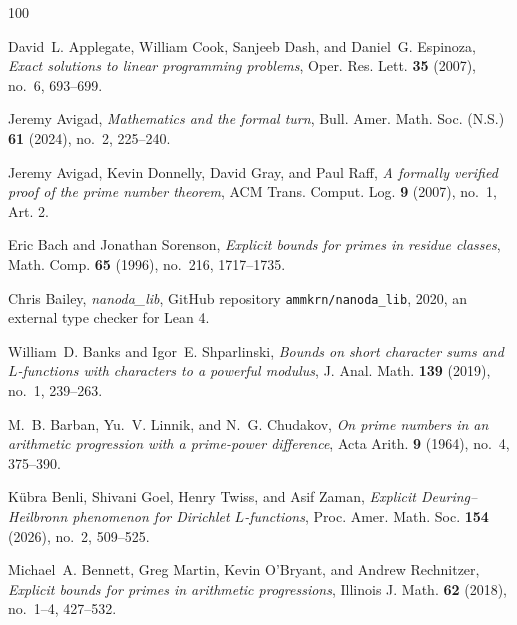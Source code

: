 \documentclass[11pt]{amsart}
\numberwithin{equation}{section}
\theoremstyle{plain}
\theoremstyle{definition}
\theoremstyle{remark}
\newcommand{\1}{\mathbf{1}}
\begin{document}

\providecommand{\bysame}{\leavevmode\hbox to3em{\hrulefill}\thinspace}
\providecommand{\MR}{\relax\ifhmode\unskip\space\fi MR }
\providecommand{\MRhref}[2]{%
  \href{http://www.ams.org/mathscinet-getitem?mr=#1}{#2}
}
\providecommand{\href}[2]{#2}
\begin{thebibliography}{100}

David~L. Applegate, William Cook, Sanjeeb Dash, and Daniel~G. Espinoza,
  \emph{Exact solutions to linear programming problems}, Oper. Res. Lett.
  \textbf{35} (2007), no.~6, 693--699.

Jeremy Avigad, \emph{Mathematics and the formal turn}, Bull. Amer. Math. Soc.
  (N.S.) \textbf{61} (2024), no.~2, 225--240.

Jeremy Avigad, Kevin Donnelly, David Gray, and Paul Raff, \emph{A formally
  verified proof of the prime number theorem}, ACM Trans. Comput. Log.
  \textbf{9} (2007), no.~1, Art. 2.

Eric Bach and Jonathan Sorenson, \emph{Explicit bounds for primes in residue
  classes}, Math. Comp. \textbf{65} (1996), no.~216, 1717--1735.

Chris Bailey, \emph{nanoda\_lib}, GitHub repository
  \texttt{ammkrn/nanoda\_lib}, 2020, an external type checker for Lean 4.

William~D. Banks and Igor~E. Shparlinski, \emph{Bounds on short character sums
  and {$L$}-functions with characters to a powerful modulus}, J. Anal. Math.
  \textbf{139} (2019), no.~1, 239--263.

M.~B. Barban, Yu.~V. Linnik, and N.~G. Chudakov, \emph{On prime numbers in an
  arithmetic progression with a prime-power difference}, Acta Arith. \textbf{9}
  (1964), no.~4, 375--390.

K{\"u}bra Benli, Shivani Goel, Henry Twiss, and Asif Zaman, \emph{Explicit
  {D}euring--{H}eilbronn phenomenon for {D}irichlet {$L$}-functions}, Proc.
  Amer. Math. Soc. \textbf{154} (2026), no.~2, 509--525.

Michael~A. Bennett, Greg Martin, Kevin O'Bryant, and Andrew Rechnitzer,
  \emph{Explicit bounds for primes in arithmetic progressions}, Illinois J.
  Math. \textbf{62} (2018), no.~1--4, 427--532.


\end{thebibliography}
\end{document}
